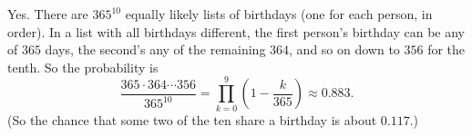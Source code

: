 Yes. There are $365^{10}$ equally likely lists of birthdays (one for each person, in order). In a list with all birthdays different, the first person's birthday can be any of $365$ days, the second's any of the remaining $364$, and so on down to $356$ for the tenth. So the probability is
\[\dfrac{365\cdot364\cdots356}{365^{10}}=\prod_{k=0}^{9}\left(1-\dfrac{k}{365}\right)\approx\boxed{0.883}.\]
(So the chance that some two of the ten share a birthday is about $0.117$.)
